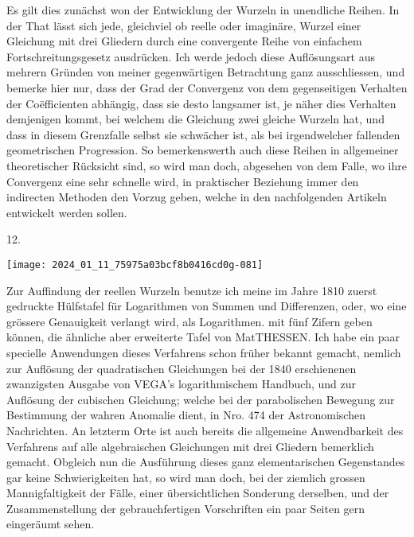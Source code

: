 \documentclass[10pt]{article}
\begin{document}
Es gilt dies zunächst won der Entwicklung der Wurzeln in unendliche Reihen. In der That lässt sich jede, gleichviel ob reelle oder imaginäre, Wurzel einer Gleichung mit drei Gliedern durch eine convergente Reihe von einfachem Fortschreitungsgesetz ausdrücken. Ich werde jedoch diese Auflösungsart aus mehrern Gründen von meiner gegenwärtigen Betrachtung ganz ausschliessen, und bemerke hier nur, dass der Grad der Convergenz von dem gegenseitigen Verhalten der Coëfficienten abhängig, dass sie desto langsamer ist, je näher dies Verhalten demjenigen kommt, bei welchem die Gleichung zwei gleiche Wurzeln hat, und dass in diesem Grenzfalle selbst sie schwächer ist, als bei irgendwelcher fallenden geometrischen Progression. So bemerkenswerth auch diese Reihen in allgemeiner theoretischer Rücksicht sind, so wird man doch, abgesehen von dem Falle, wo ihre Convergenz eine sehr schnelle wird, in praktischer Beziehung immer den indirecten Methoden den Vorzug geben, welche in den nachfolgenden Artikeln entwickelt werden sollen.

12.

\begin{center}
\texttt{[image: 2024\_01\_11\_75975a03bcf8b0416cd0g-081]}
\end{center}

Zur Auffindung der reellen Wurzeln benutze ich meine im Jahre 1810 zuerst gedruckte Hülfstafel für Logarithmen von Summen und Differenzen, oder, wo eine grössere Genauigkeit verlangt wird, als Logarithmen. mit fünf Zifern geben
können, die ähnliche aber erweiterte Tafel von MatTHESSEN. Ich habe ein paar specielle Anwendungen dieses Verfahrens schon früher bekannt gemacht, nemlich zur Auflösung der quadratischen Gleichungen bei der 1840 erschienenen zwanzigsten Ausgabe von VEGA's logarithmischem Handbuch, und zur Auflösung der cubischen Gleichung; welche bei der parabolischen Bewegung zur Bestimmung der wahren Anomalie dient, in Nro. 474 der Astronomischen Nachrichten. An letzterm Orte ist auch bereits die allgemeine Anwendbarkeit des Verfahrens auf alle algebraischen Gleichungen mit drei Gliedern bemerklich gemacht. Obgleich nun die Ausführung dieses ganz elementarischen Gegenstandes gar keine Schwierigkeiten hat, so wird man doch, bei der ziemlich grossen Mannigfaltigkeit der Fälle, einer übersichtlichen Sonderung derselben, und der Zusammenstellung der gebrauchfertigen Vorschriften ein paar Seiten gern eingeräumt sehen.
\end{document}
